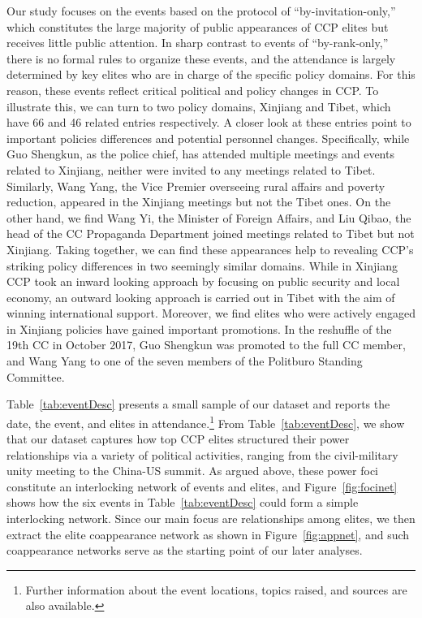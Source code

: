 \documentclass[11pt,english]{article}
\begin{document}
\begin{flushleft}
Our study focuses on the events based on the protocol of “by-invitation-only,” which constitutes the large majority of public appearances of CCP elites but receives little public attention.  In sharp contrast to events of “by-rank-only,” there is no formal rules to organize these events, and the attendance is largely determined by key elites who are in charge of the specific policy domains.  For this reason, these events reflect critical political and policy changes in CCP.  To illustrate this, we can turn to two policy domains, Xinjiang and Tibet, which have 66 and 46 related entries respectively.  A closer look at these entries point to important policies differences and potential personnel changes.  Specifically, while Guo Shengkun, as the police chief, has attended multiple meetings and events related to Xinjiang, neither were invited to any meetings related to Tibet.  Similarly, Wang Yang, the Vice Premier overseeing rural affairs and poverty reduction, appeared in the Xinjiang meetings but not the Tibet ones.  On the other hand, we find Wang Yi, the Minister of Foreign Affairs, and Liu Qibao, the head of the CC Propaganda Department joined meetings related to Tibet but not Xinjiang.  Taking together, we can find these appearances help to revealing CCP’s striking policy differences in two seemingly similar domains.  While in Xinjiang CCP took an inward looking approach by focusing on public security and local economy, an outward looking approach is carried out in Tibet with the aim of winning international support.  Moreover, we find elites who were actively engaged in Xinjiang policies have gained important promotions.  In the reshuffle of the 19th CC in October 2017, Guo Shengkun was promoted to the full CC member, and Wang Yang to one of the seven members of the Politburo Standing Committee.

Table~\ref{tab:eventDesc} presents a small sample of our dataset and reports the date, the event, and elites in attendance.\footnote{Further information about the event locations, topics raised, and sources are also available.} From Table~\ref{tab:eventDesc}, we show that our dataset captures how top CCP elites structured their power relationships via a variety of political activities, ranging from the civil-military unity meeting to the China-US summit. As argued above, these power foci constitute an interlocking network of events and elites, and Figure~\ref{fig:focinet} shows how the six events in Table~\ref{tab:eventDesc} could form a simple interlocking network. Since our main focus are relationships among elites, we then extract the elite coappearance network as shown in Figure~\ref{fig:appnet}, and such coappearance networks serve as the starting point of our later analyses.


\end{flushleft}
\end{document}
